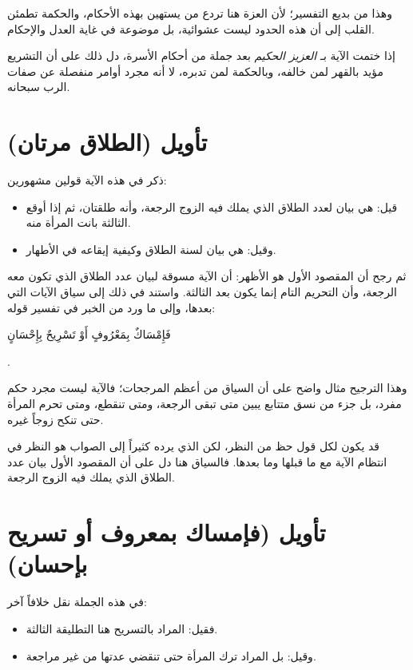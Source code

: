 وهذا من بديع التفسير؛ لأن العزة هنا تردع من يستهين بهذه الأحكام، والحكمة تطمئن القلب إلى أن هذه الحدود ليست عشوائية، بل موضوعة في غاية العدل والإحكام.

\begin{fawaid}
إذا ختمت الآية بـ \textit{العزيز الحكيم} بعد جملة من أحكام الأسرة، دل ذلك على أن التشريع مؤيد بالقهر لمن خالفه، وبالحكمة لمن تدبره، لا أنه مجرد أوامر منفصلة عن صفات الرب سبحانه.
\end{fawaid}

\separator

\section{تأويل (الطلاق مرتان)}
ذكر  في هذه الآية قولين مشهورين:
\begin{itemize}
    \item قيل: هي بيان لعدد الطلاق الذي يملك فيه الزوج الرجعة، وأنه طلقتان، ثم إذا أوقع الثالثة بانت المرأة منه.
    \item وقيل: هي بيان لسنة الطلاق وكيفية إيقاعه في الأطهار.
\end{itemize}

ثم رجح أن المقصود الأول هو الأظهر: أن الآية مسوقة لبيان عدد الطلاق الذي تكون معه الرجعة، وأن التحريم التام إنما يكون بعد الثالثة. واستند في ذلك إلى سياق الآيات التي بعدها، وإلى ما ورد من الخبر في تفسير قوله: \begin{ayah}فَإِمْسَاكٌ بِمَعْرُوفٍ أَوْ تَسْرِيحٌ بِإِحْسَانٍ\end{ayah}.

وهذا الترجيح مثال واضح على أن السياق من أعظم المرجحات؛ فالآية ليست مجرد حكم مفرد، بل جزء من نسق متتابع يبين متى تبقى الرجعة، ومتى تنقطع، ومتى تحرم المرأة حتى تنكح زوجاً غيره.

\begin{fawaid}
قد يكون لكل قول حظ من النظر، لكن الذي يرده  كثيراً إلى الصواب هو النظر في انتظام الآية مع ما قبلها وما بعدها. فالسياق هنا دل على أن المقصود الأول بيان عدد الطلاق الذي يملك فيه الزوج الرجعة.
\end{fawaid}

\section{تأويل (فإمساك بمعروف أو تسريح بإحسان)}
في هذه الجملة نقل  خلافاً آخر:
\begin{itemize}
    \item فقيل: المراد بالتسريح هنا التطليقة الثالثة.
    \item وقيل: بل المراد ترك المرأة حتى تنقضي عدتها من غير مراجعة.
\end{itemize}

